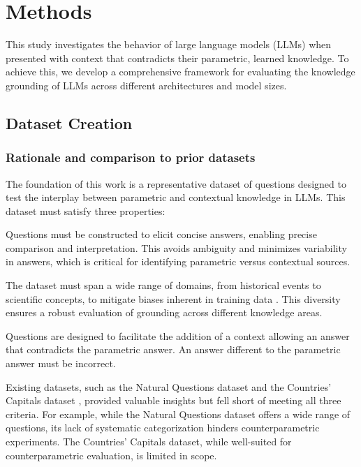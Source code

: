 \section{Methods}
\label{methodology_section}


This study investigates the behavior of large language models (LLMs) when presented with context that contradicts their parametric, learned knowledge.
To achieve this, we develop a comprehensive framework for evaluating the knowledge grounding of LLMs across different architectures and model sizes.

\subsection{Dataset Creation}
\label{dataset_creation}

\subsubsection{Rationale and comparison to prior datasets}

The foundation of this work is a representative dataset of questions designed to test the interplay between parametric and contextual knowledge in LLMs.
This dataset must satisfy three properties:
\begin{description}[style=nextline]
	\item[1. Short, unambiguous answers] Questions must be constructed to elicit concise answers, enabling precise comparison and interpretation.
This avoids ambiguity and minimizes variability in answers, which is critical for identifying parametric versus contextual sources.
	\item[2. Coverage of diverse topics] The dataset must span a wide range of domains, from historical events to scientific concepts, to mitigate biases inherent in training data \cite{wikipedia_geographic_bias}.
	This diversity ensures a robust evaluation of grounding across different knowledge areas.
	\item[3. Conterparametric compatibility] Questions are designed to facilitate the addition of a context allowing an answer that contradicts the parametric answer.
		An answer different to the parametric answer must be incorrect.
\end{description}

Existing datasets, such as the Natural Questions dataset \cite{natural_questions} and the Countries' Capitals dataset \cite{factual_recall}, provided valuable insights but fell short of meeting all three criteria.
For example, while the Natural Questions dataset offers a wide range of questions, its lack of systematic categorization hinders counterparametric experiments.
The Countries' Capitals dataset, while well-suited for counterparametric evaluation, is limited in scope.

